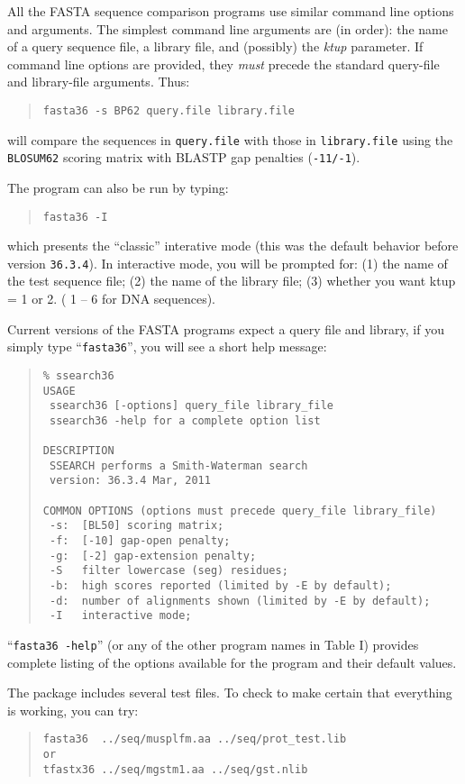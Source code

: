 \documentclass[11pt]{article}
\begin{document}
All the FASTA sequence comparison programs use similar command line
options and arguments.  The simplest command line arguments are (in
order): the name of a query sequence file, a library file, and
(possibly) the \emph{ktup} parameter.  If command line options are
provided, they \emph{must} precede the standard query-file and
library-file arguments. Thus:
\begin{quote}
\texttt{fasta36 -s BP62 query.file library.file}
\end{quote}
will compare the sequences in \texttt{query.file} with those in
\texttt{library.file} using the \texttt{BLOSUM62} scoring matrix with
BLASTP gap penalties (\texttt{-11/-1}).

The program can also be run by typing:
\begin{quote}
\texttt{fasta36 -I}
\end{quote}
which presents the ``classic'' interative mode (this was
the default behavior before version \texttt{36.3.4}).
In interactive mode,
you will be prompted for: (1) the name of the test sequence file; (2)
the name of the library file; (3) whether you want ktup = 1 or 2. (
1 -- 6 for DNA sequences).

Current versions of the FASTA programs expect a query file and library, if you simply type ``\texttt{fasta36}'', you will see a short help message:
\begin{footnotesize}
\begin{quote}
\begin{verbatim}
% ssearch36
USAGE
 ssearch36 [-options] query_file library_file
 ssearch36 -help for a complete option list

DESCRIPTION
 SSEARCH performs a Smith-Waterman search
 version: 36.3.4 Mar, 2011

COMMON OPTIONS (options must precede query_file library_file)
 -s:  [BL50] scoring matrix;
 -f:  [-10] gap-open penalty;
 -g:  [-2] gap-extension penalty;
 -S   filter lowercase (seg) residues;
 -b:  high scores reported (limited by -E by default);
 -d:  number of alignments shown (limited by -E by default);
 -I   interactive mode;
\end{verbatim}
\end{quote}
\end{footnotesize}
``\texttt{fasta36 -help}'' (or any of the other program names in Table
I) provides complete listing of the options available for the program
and their default values.

The package includes several test files.  To check to make certain
that everything is working, you can try:
\begin{quote}
\begin{verbatim}
fasta36  ../seq/musplfm.aa ../seq/prot_test.lib
or
tfastx36 ../seq/mgstm1.aa ../seq/gst.nlib
\end{verbatim}
\end{quote}
\end{document}
